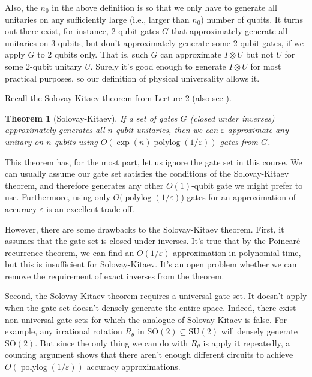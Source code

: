 \documentclass[12pt]{report}
\theoremstyle{plain}
\newtheorem{theorem}{Theorem}[section]
\theoremstyle{definition}
\newcommand{\eps}{\varepsilon}
\newcommand{\polylog}{\operatorname{polylog}}
\begin{document}
Also, the $n_0$ in the above definition is so that we only have to generate all unitaries on any sufficiently large (i.e., larger than $n_0$) number of qubits. It turns out there exist, for instance, $2$-qubit gates $G$ that approximately generate all unitaries on $3$ qubits, but don't approximately generate some $2$-qubit gates, if we apply $G$ to $2$ qubits only. That is, such $G$ can approximate $I \otimes U$ but not $U$ for some $2$-qubit unitary $U$. Surely it's good enough to generate $I \otimes U$ for most practical purposes, so our definition of physical universality allows it.

Recall the Solovay-Kitaev theorem from Lecture 2 (also see \cite{solovaykitaev}).

\begin{theorem}[Solovay-Kitaev]
If a set of gates $G$ (closed under inverses) approximately generates all $n$-qubit unitaries, then we can $\eps$-approximate any unitary on $n$ qubits using $O( \exp(n) \polylog(1/\eps))$ gates from $G$.
\end{theorem}

This theorem has, for the most part, let us ignore the gate set in this course. We can usually assume our gate set satisfies the conditions of the Solovay-Kitaev theorem, and therefore generates any other $O(1)$-qubit gate we might prefer to use. Furthermore, using only $O(\polylog(1/\eps)$) gates for an approximation of accuracy $\eps$ is an excellent trade-off.

However, there are some drawbacks to the Solovay-Kitaev theorem. First, it assumes that the gate set is closed under inverses.  It's true that by the Poincar\'{e} recurrence theorem, we can find an $O(1/\eps)$ approximation in polynomial time, but this is insufficient for Solovay-Kitaev.  It's an open problem whether we can remove the requirement of exact inverses from the theorem.

Second, the Solovay-Kitaev theorem requires a universal gate set. It doesn't apply when the gate set doesn't densely generate the entire space. Indeed, there exist non-universal gate sets for which the analogue of Solovay-Kitaev is false. For example, any irrational rotation $R_\theta$ in $\mathrm{SO}(2) \subseteq \mathrm{SU}(2)$ will densely generate $\mathrm{SO}(2)$. But since the only thing we can do with $R_\theta$ is apply it repeatedly, a counting argument shows that there aren't enough different circuits to achieve $O(\polylog(1/\eps))$ accuracy approximations.
\end{document}
